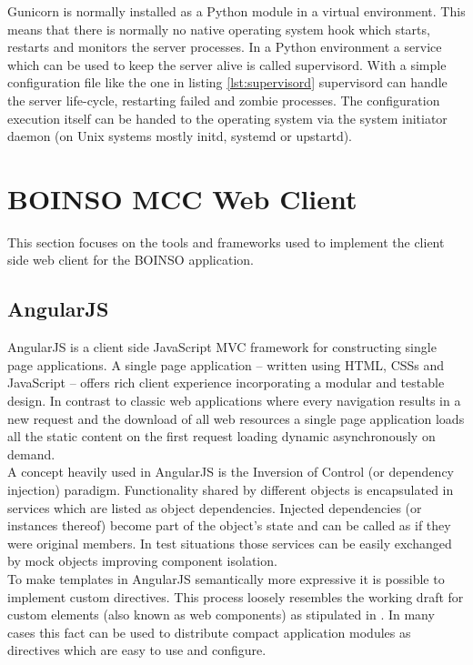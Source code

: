 \documentclass[BachelorPaper]{subfiles}
\begin{document}
Gunicorn is normally installed as a Python module in a virtual environment. This means that there is normally no native operating system hook which starts, restarts and monitors the server processes. In a Python environment a service which can be used to keep the server alive is called supervisord. With a simple configuration file like the one in listing \ref{lst:supervisord} supervisord can handle the server life-cycle, restarting failed and zombie processes. The configuration execution itself can be handed to the operating system via the system initiator daemon (on Unix systems mostly initd, systemd or upstartd).\\



\section{BOINSO MCC Web Client}
\label{sec:mat_boinso_web}
This section focuses on the tools and frameworks used to implement the client side web client for the BOINSO application.

\subsection{AngularJS}
\label{subsec:mat_angular}
AngularJS is a client side JavaScript \ac{MVC} framework for constructing single page applications. A single page application -- written using \ac{HTML}, \acp{CSS} and JavaScript -- offers rich client experience incorporating a modular and testable design. In contrast to classic web applications where every navigation results in a new request and the download of all web resources a single page application loads all the static content on the first request loading dynamic asynchronously on demand.\\

A concept heavily used in AngularJS is the Inversion of Control (or dependency injection) paradigm. Functionality shared by different objects is encapsulated in services which are listed as object dependencies. Injected dependencies (or instances thereof) become part of the object's state and can be called as if they were original members. In test situations those services can be easily exchanged by mock objects improving component isolation.\\

To make templates in AngularJS semantically more expressive it is possible to implement custom directives. This process loosely resembles the working draft for custom elements (also known as web components) as stipulated in \cite{w3c_custom_elements_2014}. In many cases this fact can be used to distribute compact application modules as directives which are easy to use and configure.
\end{document}
